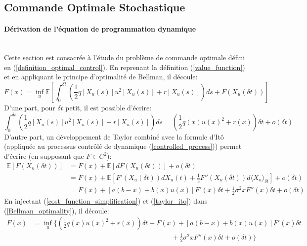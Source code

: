 \subsection{Commande Optimale Stochastique}

\paragraph{Dérivation de l'équation de programmation dynamique}\phantom{}\\
Cette section est consacrée à l'étude du problème de commande optimale défini en (\ref{definition_optimal_control}).
En reprenant la définition (\ref{value_function}) et en appliquant le principe d'optimalité de Bellman, il découle:
\begin{equation}\label{Bellman_optimality}
        F(x) = \inf_u\mathds{E}\left[\int_0^{\delta t}\left(\frac{1}{2}q\left[X_u(s)\right]u^2\left[X_u(s)\right]+r\left[X_u(s)\right]\right)ds+F(X_u(\delta t))\right]
\end{equation}
D'une part, pour $\delta t$ petit, il est possible d'écrire:
\begin{equation}\label{cost_function_simplification}
    \int_0^{\delta t}\left(\frac{1}{2}q\left[X_u(s)\right]u^2\left[X_u(s)\right]+r\left[X_u(s)\right]\right)ds=\left(\frac{1}{2}q(x){u(x)}^2+r(x)\right)\delta t+o(\delta t)
\end{equation}
D'autre part, un développement de Taylor combiné avec la formule d'Itô (appliquée au processus contrôlé de dynamique (\ref{controlled_process})) permet d'écrire (en supposant que $F\in C^2$):
\begin{equation}\label{taylor_ito}
    \begin{aligned}
        \mathds{E}[F(X_u(\delta t))]&=F(x)+\mathds{E}[dF(X_u(\delta t))]+o(\delta t)\\
        &=F(x)+\mathds{E}\left[F'(X_u(\delta t))dX_u(t)+\frac{1}{2}F''(X_u(\delta t))d\langle X_u\rangle_{\delta t} \right]+o(\delta t)\\
        &=F(x)+\left[a(b-x)+b(x)u(x)\right]F'(x)\delta t+\frac{1}{2}\sigma^2xF''(x)\delta t+o(\delta t)
    \end{aligned}
\end{equation}
En injectant (\ref{cost_function_simplification}) et (\ref{taylor_ito}) dans (\ref{Bellman_optimality}), il découle:
\begin{equation}\label{initial_minimisation problem}
    \begin{aligned}
        F(x)&=\inf_u\Bigg\{\left(\frac{1}{2}q(x){u(x)}^2+r(x)\right)\delta t+F(x)+\left[a(b-x)+b(x)u(x)\right]F'(x)\delta t\\&\quad\quad\quad\quad\quad\quad\quad\quad\quad\quad\quad\quad\quad\quad\quad\quad\quad\quad\quad\quad+\frac{1}{2}\sigma^2xF''(x)\delta t+o(\delta t)\Bigg\}
    \end{aligned}
\end{equation}
